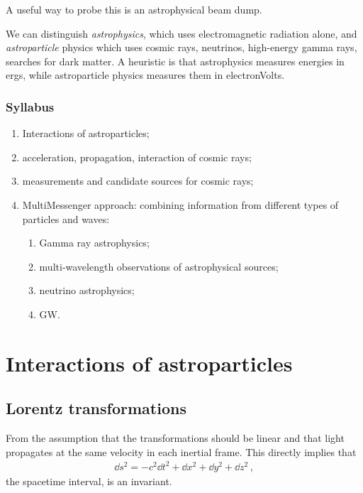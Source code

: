 \documentclass[main.tex]{subfiles}
\begin{document}
A useful way to probe this is an astrophysical beam dump. 

We can distinguish \emph{astrophysics}, which uses electromagnetic radiation alone, and \emph{astroparticle} physics which uses cosmic rays, neutrinos, high-energy gamma rays, searches for dark matter. 
A heuristic is that astrophysics measures energies in ergs, while astroparticle physics measures them in electronVolts. 

\subsection{Syllabus}

\begin{enumerate}
  \item Interactions of astroparticles;
  \item acceleration, propagation, interaction of cosmic rays;
  \item measurements and candidate sources for cosmic rays;
  \item MultiMessenger approach: combining information from different types of particles and waves: 
  \begin{enumerate}
    \item Gamma  ray astrophysics;
    \item multi-wavelength observations of astrophysical sources;
    \item neutrino astrophysics;
    \item GW.
  \end{enumerate}
\end{enumerate}

\chapter{Interactions of astroparticles}

\section{Lorentz transformations}

From the assumption that the transformations should be linear and that light propagates at the same velocity in each inertial frame. This directly implies that 
%
\begin{align}
\dd{s^2} = - c^2 \dd{t^2} + \dd{x^2} + \dd{y^2} + \dd{z^2}
\,,
\end{align}
%
the spacetime interval, is an invariant.
\end{document}
